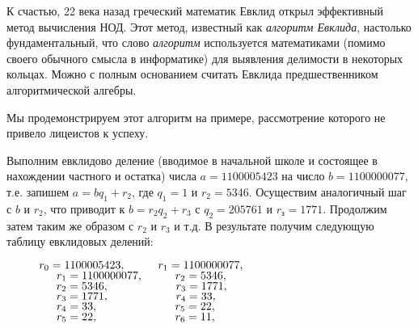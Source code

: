 К счастью, 22 века назад греческий математик Евклид открыл эффективный метод вычисления НОД. Этот метод, известный как {\it алгоритм Евклида}, настолько фундаментальный, что слово {\it алгоритм} используется математиками (помимо своего обычного смысла в информатике) для выявления делимости в некоторых кольцах. Можно с полным основанием считать Евклида предшественником алгоритмической алгебры.
\newpage

Мы продемонстрируем этот алгоритм на примере, рассмотрение которого не привело лицеистов к успеху. 

Выполним евклидово деление (вводимое в начальной школе и состоящее в нахождении частного и остатка) числа $a = 1100 005 423$ на число $b = 1 100 000 077$, т.е. запишем $a = bq_1 + r_2$, где $q_1 = 1$ и $r_2 = 5346$. Осуществим аналогичный шаг с $b$ и $r_2$, что приводит к $b = r_2q_2 + r_3$ с $q_2 = 205 761$ и $r_з = 1771$. Продолжим затем таким же образом с $r_2$ и $r_3$ и т.д. В результате получим следующую таблицу евклидовых делений: 

$\hspace*{1cm} r_0 = 1 100 005 423, \hspace*{1cm}r_1 = 1 100 000 077,$\\ 
$\hspace*{1.54cm} r_1 = 1 100 000 077,\hspace*{1cm} r_2 = 5 346, $\\
$\hspace*{1.54cm} r_2 = 5 346,\hspace*{2.08cm} r_3 = 1 771,$ \\
$\hspace*{1.54cm} r_3 = 1 771,\hspace*{2.08cm} r_4 = 33,$ \\
$\hspace*{1.54cm} r_4 = 33,\hspace*{2.4cm} r_5 = 22, $\\
$\hspace*{1.54cm} r_5 = 22,\hspace*{2.4cm} r_6 = 11,$ \\

